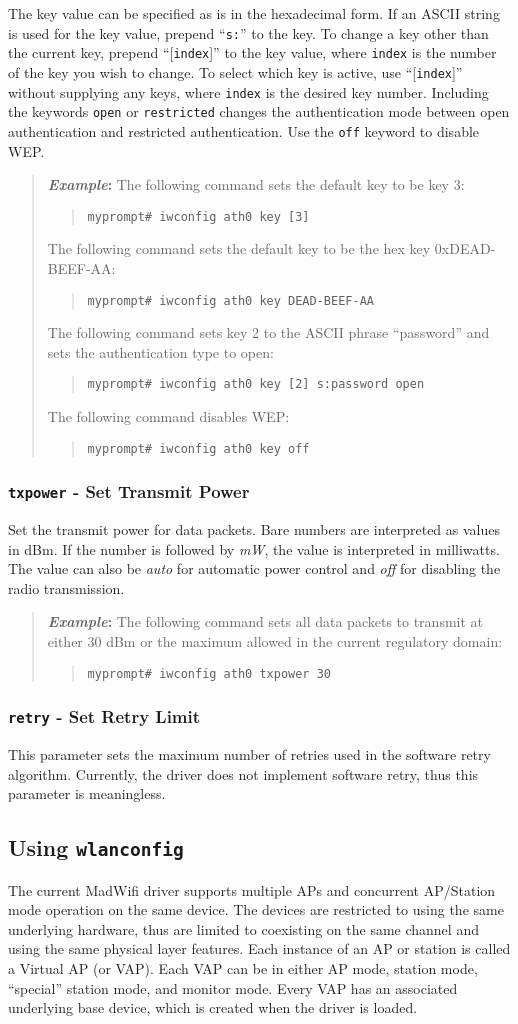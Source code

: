 \documentclass[10pt,fullpage]{article}
\newcommand{\mytt}[1]{{\texttt{#1}}}
\newcommand{\bv}{\begin{verse}}
\newcommand{\ev}{\end{verse}}
\newcommand{\cmd}[1]{{\texttt{myprompt\# #1}}}
\newcommand{\clival}[1]{{\emph{#1}}}
\newenvironment{example}{\begin{quote}\textbf{\textit{Example}:}}{\end{quote}}
\begin{document}
The key value can be specified as is in the hexadecimal form.  If an
ASCII string is used for the key value, prepend ``\mytt{s:}'' to the
key.  To change a key other than the current key, prepend
``[\mytt{index}]'' to the key value, where \mytt{index} is the number of
the key you wish to change.  To select which key is active, use
``[\mytt{index}]'' without supplying any keys, where \mytt{index} is the
desired key number.   Including the keywords \mytt{open} or
\mytt{restricted} changes the authentication mode between open
authentication and restricted authentication.  Use the \mytt{off}
keyword to disable WEP.
\begin{example}
  The following command sets the default key to be key 3:
  \bv
  \cmd{iwconfig ath0 key [3]}
  \ev
  The following command sets the default key to be the hex key
  0xDEAD-BEEF-AA:
  \bv
  \cmd{iwconfig ath0 key DEAD-BEEF-AA}
  \ev
  The following command sets key 2 to the ASCII phrase ``password''
  and sets the authentication type to open:
  \bv
  \cmd{iwconfig ath0 key [2] s:password open}
  \ev
  The following command disables WEP:
  \bv
  \cmd{iwconfig ath0 key off}
  \ev
\end{example}

\subsubsection{\mytt{txpower} - Set Transmit Power}
Set the transmit power for data packets.  Bare numbers are interpreted
as values in dBm.  If the number is followed by \clival{mW}, the value
is interpreted in milliwatts.  The value can also be \clival{auto} for
automatic power control and \clival{off} for disabling the radio
transmission.
\begin{example}
  The following command sets all data packets to transmit at either 30
  dBm or the maximum allowed in the current regulatory domain:
  \bv
  \cmd{iwconfig ath0 txpower 30}
  \ev
\end{example}

\subsubsection{\mytt{retry} - Set Retry Limit}
This parameter sets the maximum number of retries used in the software
retry algorithm.  Currently, the driver does not implement software
retry, thus this parameter is meaningless.

\subsection{Using \mytt{wlanconfig}}
\label{sec:wlanconfig}
The current MadWifi driver supports multiple APs and concurrent
AP/Station mode operation on the same device.  The devices are
restricted to using the same underlying hardware, thus are limited to
coexisting on the same channel and using the same physical layer
features.  Each instance of an AP or station is called a Virtual AP
(or VAP). Each VAP can be in either AP mode, station mode, ``special''
station mode, and monitor mode.  Every VAP has an associated
underlying base device, which is created when the driver is loaded.
\end{document}
